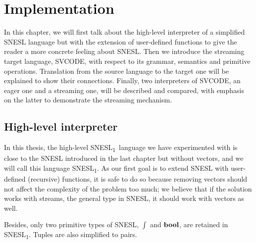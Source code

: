 
\newcommand\tr{\triangleright}
\newcommand{\proc}{\*{Proc}}
\newcommand{\bufst}{\*{BufState}}
\newcommand{\sups}{\*{Sups}}
\newcommand{\clis}{\*{Clis}}
\newcommand{\xducer}{\*{Xducer}}
\newcommand{\filling}{\texttt{Filling} \ }
\newcommand{\draining}{\texttt{Draining} \ }
\newcommand{\pin}{\texttt{Pin} \ }
\newcommand{\pout}{\texttt{Pout}}
\newcommand{\done}{\texttt{Done}}

\newcommand{\ftype}{\varphi}

\newcommand\mysnesl{SNESL\textsubscript{1}}

\def\interT#1#2#3{\vdash_{#1} #2 : #3}
\def\conc#1{#1 \ {\mathbf{concrete}}}

\chapter{Implementation}

\def\Type#1#2#3{#1 \vdash_{\Sigma} \ #2 : #3 } 
\def\Eval#1#2#3{#1 \vdash_{\Phi} #2 \Eva #3 } 

In this chapter, we will first talk about the high-level interpreter of a simplified SNESL language but with the extension of user-defined functions to give the reader a more concrete feeling about SNESL. 
Then we introduce the streaming target language, SVCODE, with respect to its grammar, semantics and primitive operations.
Translation from the source language to the target one will be explained to show their connections.
Finally, two interpreters of SVCODE, an eager one and a streaming one, will be described and compared, with emphasis on the latter to demonstrate the streaming mechanism.



\section{High-level interpreter}


In this thesis, the high-level \mysnesl \ language we have experimented with is close to the SNESL introduced in the last chapter but without vectors, and we will call this language \mysnesl.
As our first goal is to extend SNESL with user-defined (recursive) functions,
it is safe to do so because removing vectors should not affect the complexity of the problem too much; we believe that if the solution works with streams, the general type in SNESL, it should work with vectors as well. 

Besides, only two primitive types of SNESL, $\int$ and $\mathbf{bool}$, are retained in \mysnesl. 
Tuples are also simplified to pairs.  

